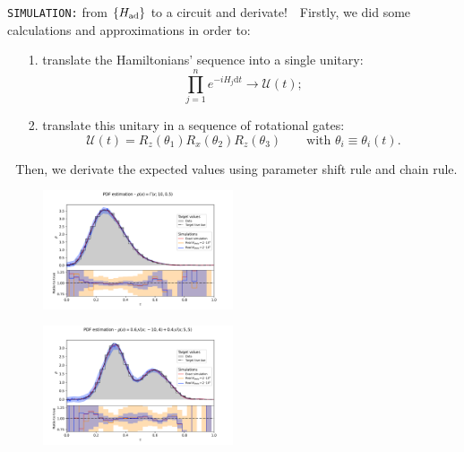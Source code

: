 \documentclass[9pt, xcolor={svgnames}, hyperref={colorlinks, linkcolor=black, citecolor=amethyst, urlcolor=amethyst}]{beamer}
\begin{document}
\begin{frame}{\texttt{SIMULATION:} from $\{H_{\rm ad}\}$ to a circuit and derivate!}
\small
\faArrowCircleRight\,\, Firstly, we did some calculations and approximations in order to:
\begin{itemize}[noitemsep]
\item[1.] translate the Hamiltonians' sequence into a single unitary:
$$\prod_{j=1}^{n} e^{-i H_{j}\text{d}t} \to \mathcal{U}(t);$$
\item[2.] translate this unitary in a sequence of rotational gates:
$$ \mathcal{U}(t) = R_z(\theta_1)R_x(\theta_2)R_z(\theta_3) \qquad \text{with}\,\, \theta_i \equiv \theta_i(t).$$
\end{itemize}
\faArrowCircleRight\,\, Then, we derivate the expected values using parameter shift rule
and chain rule.
\begin{multicols}{2}
\begin{figure}
    \includegraphics[width=0.5\textwidth]{figures/PDF_gamma_25_20_200000.pdf}
\end{figure}
\begin{figure}
    \includegraphics[width=0.5\textwidth]{figures/PDF_gauss_30_20_200000.pdf}
\end{figure}
\end{multicols}
\end{frame}
\end{document}
